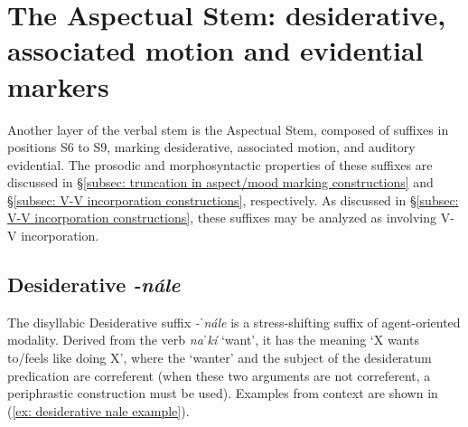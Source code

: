 \section[The Aspectual Stem]{The Aspectual Stem: desiderative, associated motion and evidential markers}
\label{sec: the aspectual stem}

Another layer of the verbal stem is the Aspectual Stem, composed of suffixes in positions S6 to S9, marking desiderative, associated motion, and auditory evidential. The prosodic and morphosyntactic properties of these suffixes are discussed in §\ref{subsec: truncation in aspect/mood marking constructions} and §\ref{subsec: V-V incorporation constructions}, respectively. As discussed in §\ref{subsec: V-V incorporation constructions}, these suffixes may be analyzed as involving V-V incorporation.

\subsection{Desiderative \textit{-nále}}
\label{subsec: desiderative}

The disyllabic Desiderative suffix \textit{-ˈnále} is a stress-shifting suffix of agent-oriented modality. Derived from the verb \textit{naˈkí} ‘want’, it has the meaning ‘X wants to/feels like doing X’, where the ‘wanter’ and the subject of the desideratum predication are correferent (when these two arguments are not correferent, a periphrastic construction must be used). Examples from context are shown in (\ref{ex: desiderative nale example}).

\ea\label{ex: desiderative nale example}

    \z
\z

